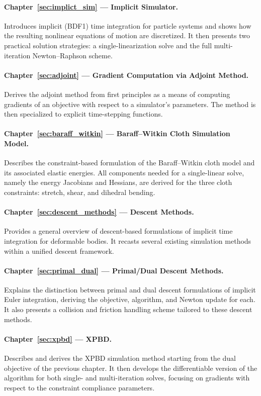 \documentclass{article}
\begin{document}
\paragraph{Chapter~\ref{sec:implict_sim} — Implicit Simulator.}
Introduces implicit (BDF1) time integration for particle systems and shows how the resulting nonlinear equations of motion are discretized. It then presents two practical solution strategies: a single-linearization solve and the full multi-iteration Newton--Raphson scheme.

\paragraph{Chapter~\ref{sec:adjoint} — Gradient Computation via Adjoint Method.}
Derives the adjoint method from first principles as a means of computing gradients of an objective with respect to a simulator's parameters. The method is then specialized to explicit time-stepping functions.

\paragraph{Chapter~\ref{sec:baraff_witkin} — Baraff--Witkin Cloth Simulation Model.}
Describes the constraint-based formulation of the Baraff--Witkin cloth model and its associated elastic energies. All components needed for a single-linear solve, namely the energy Jacobians and Hessians, are derived for the three cloth constraints: stretch, shear, and dihedral bending.

\paragraph{Chapter~\ref{sec:descent_methods} — Descent Methods.}
Provides a general overview of descent-based formulations of implicit time integration for deformable bodies. It recasts several existing simulation methods within a unified descent framework.

\paragraph{Chapter~\ref{sec:primal_dual} — Primal/Dual Descent Methods.}
Explains the distinction between primal and dual descent formulations of implicit Euler integration, deriving the objective, algorithm, and Newton update for each. It also presents a collision and friction handling scheme tailored to these descent methods.

\paragraph{Chapter~\ref{sec:xpbd} — XPBD.}
Describes and derives the XPBD simulation method starting from the dual objective of the previous chapter. It then develops the differentiable version of the algorithm for both single- and multi-iteration solves, focusing on gradients with respect to the constraint compliance parameters.
\end{document}
